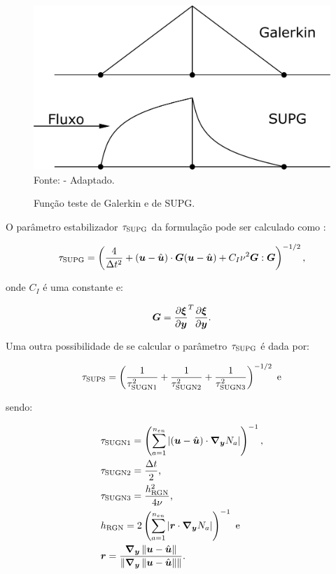 \begin{figure}[h!]
    \centering
    \caption{Função teste de Galerkin e de SUPG.}
    \includegraphics[width=.6\linewidth]{Figuras/SUPG.pdf}
    \\Fonte:  - Adaptado.
    \label{fig:Supg}
\end{figure}


O parâmetro estabilizador $\tau_{\mathrm{SUPG}}$ da formulação pode ser calculado como \cite{bazilevs2013computational}:

\begin{equation}
    \tau_{\mathrm{SUPG}}=\left({\frac{4}{\Delta t^2}+(\boldsymbol{u}-\hat{\boldsymbol{u}})\cdot\boldsymbol{G}(\boldsymbol{u}-\hat{\boldsymbol{u}})+C_I\nu^2\boldsymbol{G}:\boldsymbol{G}}\right)^{-1/2}\text{,}
    \label{eq:tauSUPG}
\end{equation}

\noindent onde $C_I$ é uma constante e:

\begin{equation}
    \boldsymbol{G}=\frac{\partial\boldsymbol{\xi}}{\partial\boldsymbol{y}}^T\frac{\partial\boldsymbol{\xi}}{\partial\boldsymbol{y}}\text{.}
\end{equation}

Uma outra possibilidade de se calcular o parâmetro $\tau_{\mathrm{SUPG}}$ é dada por:

\begin{equation}
    \tau_{\mathrm{SUPS}}=\left({\frac{1}{\tau_{\mathrm{SUGN} 1}^2}+\frac{1}{\tau_{\mathrm{SUGN} 2}^2}+\frac{1}{\tau_{\mathrm{SUGN} 3}^2}}\right)^{-1/2}\text{ e}
    \label{eq:tauSUPG2}
\end{equation}

\noindent sendo:

\begin{subequations}
    \begin{align}
         & \tau_{\mathrm{SUGN} 1}=\left({\sum_{a=1}^{n_{en}}{\left|{(\boldsymbol{u}-\hat{\boldsymbol{u}})\cdot\boldsymbol{\nabla_y} N_a}\right|}}\right)^{-1}\text{,} \\
         & \tau_{\mathrm{SUGN} 2}=\frac{\Delta t}{2}\text{,}                                                    \\
         & \tau_{\mathrm{SUGN} 3}=\frac{h_{\mathrm{RGN}}^2}{4\nu}\text{,}                                               \\
         & h_{\mathrm{RGN}}=2\left({\sum_{a=1}^{n_{en}}{\left|{\boldsymbol{r}\cdot\boldsymbol{\nabla_y} N_a}\right|}}\right)^{-1}\text{ e}                 \\
         & \boldsymbol{r}=\frac{\boldsymbol{\nabla_y}\left\lVert{\boldsymbol{u}-\hat{\boldsymbol{u}}}\right\lVert}{\left\lVert{\boldsymbol{\nabla_y}\left\lVert{\boldsymbol{u}-\hat{\boldsymbol{u}}}\right\lVert}\right\lVert}\text{.}
    \end{align}
\end{subequations}

